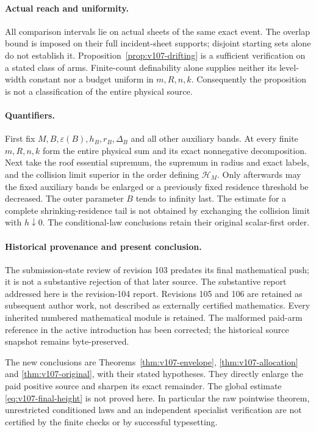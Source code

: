 \paragraph{Actual reach and uniformity.}
All comparison intervals lie on actual sheets of the same exact
event. The overlap bound is imposed on their full incident-sheet
supports; disjoint starting sets alone do not establish it.
Proposition~\ref{prop:v107-drifting} is a sufficient verification
on a stated class of arms. Finite-count definability alone supplies
neither its level-width constant nor a budget uniform in $m,R,n,k$.
Consequently the proposition is not a classification of the entire
physical source.

\paragraph{Quantifiers.}
First fix $M,B,\varepsilon(B),h_B,r_B,\Delta_B$ and all other
auxiliary bands. At every finite $m,R,n,k$ form the entire physical
sum and its exact nonnegative decomposition. Next take the roof
essential supremum, the supremum in radius and exact labels, and the
collision limit superior in the order defining $\mathcal H_M$.
Only afterwards may the fixed auxiliary bands be enlarged or a
previously fixed residence threshold be decreased. The outer
parameter $B$ tends to infinity last. The estimate for a complete
shrinking-residence tail is not obtained by exchanging the collision
limit with $h\downarrow0$. The conditional-law conclusions retain
their original scalar-first order.

\paragraph{Historical provenance and present conclusion.}
The submission-state review of revision 103 predates its final
mathematical push; it is not a substantive rejection of that later
source. The substantive report addressed here is the revision-104
report. Revisions 105 and 106 are retained as subsequent author
work, not described as externally certified mathematics. Every
inherited numbered mathematical module is retained. The malformed
paid-arm reference in the active introduction has been corrected;
the historical source snapshot remains byte-preserved.

The new conclusions are Theorems~\ref{thm:v107-envelope},
\ref{thm:v107-allocation} and \ref{thm:v107-original}, with their
stated hypotheses. They directly enlarge the paid positive source
and sharpen its exact remainder. The global estimate
\eqref{eq:v107-final-height} is not proved here. In particular the
raw pointwise theorem, unrestricted conditioned laws and an
independent specialist verification are not certified by the finite
checks or by successful typesetting.
